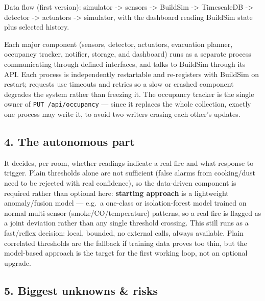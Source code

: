 \documentclass[
  10pt,
]{article}
\begin{document}
Data flow (first version): simulator -\textgreater{} sensors
-\textgreater{} BuildSim -\textgreater{} TimescaleDB -\textgreater{}
detector -\textgreater{} actuators -\textgreater{} simulator, with the
dashboard reading BuildSim state plus selected history.

Each major component (sensors, detector, actuators, evacuation planner,
occupancy tracker, notifier, storage, and dashboard) runs as a separate
process communicating through defined interfaces, and talks to BuildSim
through its API. Each process is independently restartable and
re-registers with BuildSim on restart; requests use timeouts and retries
so a slow or crashed component degrades the system rather than freezing
it. The occupancy tracker is the single owner of
\texttt{PUT\ /api/occupancy} --- since it replaces the whole collection,
exactly one process may write it, to avoid two writers erasing each
other's updates.

\subsection{4. The autonomous part}\label{the-autonomous-part}

It decides, per room, whether readings indicate a real fire and what
response to trigger. Plain thresholds alone are not sufficient (false
alarms from cooking/dust need to be rejected with real confidence), so
the data-driven component is required rather than optional here:
\textbf{starting approach} is a lightweight anomaly/fusion model ---
e.g.~a one-class or isolation-forest model trained on normal
multi-sensor (smoke/CO/temperature) patterns, so a real fire is flagged
as a joint deviation rather than any single threshold crossing. This
still runs as a fast/reflex decision: local, bounded, no external calls,
always available. Plain correlated thresholds are the fallback if
training data proves too thin, but the model-based approach is the
target for the first working loop, not an optional upgrade.

\subsection{5. Biggest unknowns \& risks}\label{biggest-unknowns-risks}
\end{document}
